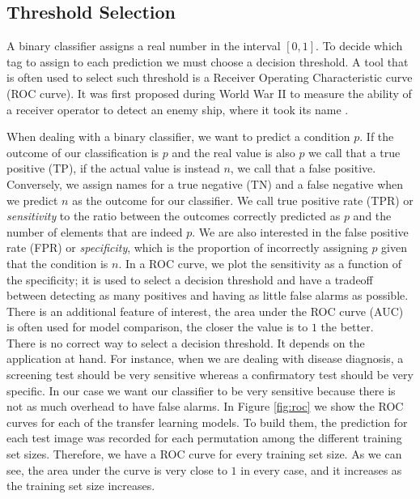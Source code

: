 \subsection{Threshold Selection}

A binary classifier assigns a real number in the interval $[0,1]$. To decide which tag to assign to each prediction we must choose a decision threshold. A tool that is often used to select such threshold is a Receiver Operating Characteristic curve (ROC curve). It was first proposed during World War II to measure the ability of a receiver operator to detect an enemy ship, where it took its name \cite{GreenSwets66}.

When dealing with a binary classifier, we want to predict a condition $p$. If the outcome of our classification is $p$ and the real value is also $p$ we call that a true positive (TP), if the actual value is instead $n$, we call that a false positive. Conversely, we assign names for a true negative (TN) and a false negative when we predict $n$ as the outcome for our classifier. We call true positive rate (TPR) or \textit{sensitivity} to the ratio between the outcomes correctly predicted as $p$ and the number of elements that are indeed $p$. We are also interested in the false positive rate (FPR) or \textit{specificity}, which is the proportion of incorrectly assigning $p$ given that the condition is $n$. In a ROC curve, we plot the sensitivity as a function of the specificity; it is used to select a decision threshold and have a tradeoff between detecting as many positives and having as little false alarms as possible. There is an additional feature of interest, the area under the ROC curve (AUC) is often used for model comparison, the closer the value is to $1$ the better.\\

There is no correct way to select a decision threshold. It depends on the application at hand. For instance, when we are dealing with disease diagnosis, a screening test should be very sensitive whereas a confirmatory test should be very specific. In our case we want our classifier to be very sensitive because there is not as much overhead to have false alarms. In Figure \ref{fig:roc} we show the ROC curves for each of the transfer learning models. To build them, the prediction for each test image was recorded for each permutation among the different training set sizes. Therefore, we have a ROC curve for every training set size. As we can see, the area under the curve is very close to $1$ in every case, and it increases as the training set size increases.\\

